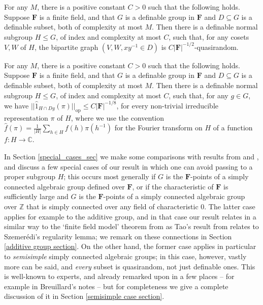\documentclass[10pt]{article}
\begin{document}
{\begin{theorem}
    For any $M$, there is a positive constant $C>0$ such that the following holds. Suppose $\mathbf{F}$ is a finite field, and that $G$ is a definable group in $\mathbf{F}$ and $D\subseteq G$ is a definable subset, both of complexity at most $M$. Then there is a definable normal subgroup $H\leqslant G$, of index and complexity at most $C$, such that, for any cosets $V,W$ of $H$, the bipartite graph $(V,W,xy^{-1}\in D)$ is $C|\mathbf{F}|^{-1/2}$-quasirandom.
\end{theorem}
\begin{corollary}
    For any $M$, there is a positive constant $C>0$ such that the following holds. Suppose $\mathbf{F}$ is a finite field, and that $G$ is a definable group in $\mathbf{F}$ and $D\subseteq G$ is a definable subset, both of complexity at most $M$. Then there is a definable normal subgroup $H\leqslant G$, of index and complexity at most $C$, such that, for any $g\in G$, we have $||\widehat{1}_{H\cap Dg}(\pi)||_{\mathrm{op}}\leqslant C|\mathbf{F}|^{-1/8}$, for every non-trivial irreducible representation $\pi$ of $H$, where we use the convention $\widehat{f}(\pi)=\frac{1}{|H|}\sum_{h\in H}f(h)\pi(h^{-1})$ for the Fourier transform on $H$ of a function $f:H\to\mathbb{C}$.
\end{corollary} In Section \ref{special_cases_sec} we make some comparisons with results from \cite{green} and \cite{gowers_groups}, and discuss a few special cases of our result in which one can avoid passing to a proper subgroup $H$; this occurs most generally if $G$ is the $\mathbf{F}$-points of a simply connected algebraic group defined over $\mathbf{F}$, or if the characteristic of $\mathbf{F}$ is sufficiently large and $G$ is the $\mathbf{F}$-points of a simply connected algebraic group over $\mathbb{Z}$ that is simply connected over any field of characteristic $0$. The latter case applies for example to the additive group, and in that case our result relates in a similar way to the `finite field model' theorem from \cite{green} as Tao's result from \cite{tao} relates to Szemerédi's regularity lemma; we remark on these connections in Section \ref{additive group section}. On the other hand, the former case applies in particular to \textit{semisimple} simply connected algebraic groups; in this case, however, vastly more can be said, and \textit{every} subset is quasirandom, not just definable ones. This is well-known to experts, and already remarked upon in a few places – for example in Breuillard's notes \cite{breuillard_2} – but for completeness we give a complete discussion of it in Section \ref{semisimple case section}.

}
\end{document}
